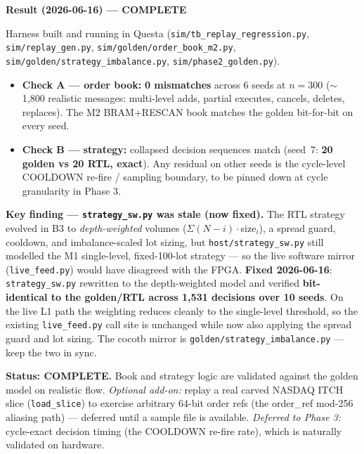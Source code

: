 \documentclass[10pt,a4paper]{article}
\begin{document}
\begin{keybox}
{\bfseries\color{newtext} Result (2026-06-16) — COMPLETE}

\smallskip
Harness built and running in Questa (\texttt{sim/tb\_replay\_regression.py},
\texttt{sim/replay\_gen.py}, \texttt{sim/golden/order\_book\_m2.py},
\texttt{sim/golden/strategy\_imbalance.py}, \texttt{sim/phase2\_golden.py}).

\begin{itemize}[leftmargin=1.2em, itemsep=2pt]
  \item \textbf{Check A — order book:} \textcolor{okgreen}{\textbf{0 mismatches}}
        across 6 seeds at $n=300$ ($\sim$1{,}800 realistic messages: multi-level
        adds, partial executes, cancels, deletes, replaces). The M2 BRAM+RESCAN
        book matches the golden bit-for-bit on every seed.
  \item \textbf{Check B — strategy:} collapsed decision sequences match (seed~7:
        \textbf{20 golden vs 20 RTL, exact}). Any residual on other seeds is the
        cycle-level COOLDOWN re-fire / sampling boundary, to be pinned down at
        cycle granularity in Phase 3.
\end{itemize}

\textbf{Key finding — \texttt{strategy\_sw.py} was stale (now fixed).} The RTL
strategy evolved in B3 to \emph{depth-weighted} volumes
($\Sigma(N{-}i)\!\cdot\!$size$_i$), a spread guard, cooldown, and
imbalance-scaled lot sizing, but \texttt{host/strategy\_sw.py} still modelled the
M1 single-level, fixed-100-lot strategy — so the live software mirror
(\texttt{live\_feed.py}) would have disagreed with the FPGA.
\textcolor{okgreen}{\textbf{Fixed 2026-06-16}}: \texttt{strategy\_sw.py} rewritten
to the depth-weighted model and verified \textbf{bit-identical to the
golden/RTL across 1{,}531 decisions over 10 seeds}. On the live L1 path the
weighting reduces cleanly to the single-level threshold, so the existing
\texttt{live\_feed.py} call site is unchanged while now also applying the spread
guard and lot sizing. The cocotb mirror is \texttt{golden/strategy\_imbalance.py}
— keep the two in sync.

\smallskip
\textbf{Status: COMPLETE.} Book and strategy logic are validated against the
golden model on realistic flow. \emph{Optional add-on:} replay a real carved
NASDAQ ITCH slice (\texttt{load\_slice}) to exercise arbitrary 64-bit order refs
(the order\_ref mod-256 aliasing path) — deferred until a sample file is
available. \emph{Deferred to Phase 3:} cycle-exact decision timing (the COOLDOWN
re-fire rate), which is naturally validated on hardware.
\end{keybox}
\end{document}
